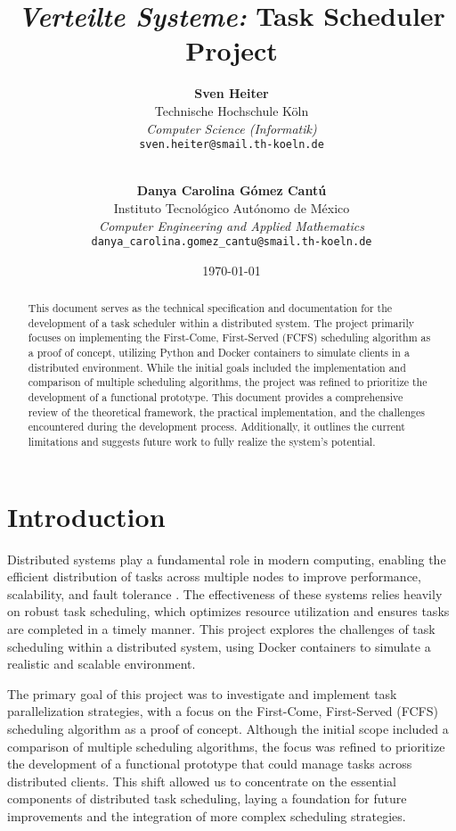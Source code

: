 \documentclass{article}
\title{\textit{Verteilte Systeme:} Task Scheduler Project}
\author{
    \textbf{Sven Heiter}\\Technische Hochschule Köln\\\textit{Computer Science (Informatik)}\\
    \texttt{sven.heiter@smail.th-koeln.de}
    \and \\
    \textbf{Danya Carolina Gómez Cantú}\\Instituto Tecnológico Autónomo de México\\\textit{Computer Engineering and Applied Mathematics}\\
    \texttt{danya\_carolina.gomez\_cantu@smail.th-koeln.de}
}
\date{\today}
\begin{document}
\maketitle

\begin{abstract}
This document serves as the technical specification and documentation for the development of a task scheduler within a distributed system. The project primarily focuses on implementing the First-Come, First-Served (FCFS) scheduling algorithm as a proof of concept, utilizing Python and Docker containers to simulate clients in a distributed environment. While the initial goals included the implementation and comparison of multiple scheduling algorithms, the project was refined to prioritize the development of a functional prototype. This document provides a comprehensive review of the theoretical framework, the practical implementation, and the challenges encountered during the development process. Additionally, it outlines the current limitations and suggests future work to fully realize the system's potential.
\end{abstract}

\newpage

\tableofcontents

\newpage

\section{Introduction}
Distributed systems play a fundamental role in modern computing, enabling the efficient distribution of tasks across multiple nodes to improve performance, scalability, and fault tolerance \cite{Karatza, 2004}. The effectiveness of these systems relies heavily on robust task scheduling, which optimizes resource utilization and ensures tasks are completed in a timely manner. This project explores the challenges of task scheduling within a distributed system, using Docker containers to simulate a realistic and scalable environment.

The primary goal of this project was to investigate and implement task parallelization strategies, with a focus on the First-Come, First-Served (FCFS) scheduling algorithm as a proof of concept. Although the initial scope included a comparison of multiple scheduling algorithms, the focus was refined to prioritize the development of a functional prototype that could manage tasks across distributed clients. This shift allowed us to concentrate on the essential components of distributed task scheduling, laying a foundation for future improvements and the integration of more complex scheduling strategies.
\end{document}
